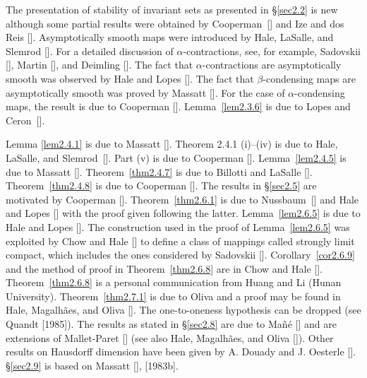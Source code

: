 \documentclass{surv-l}
\theoremstyle{plain}
\theoremstyle{definition}
\numberwithin{equation}{section}
\numberwithin{figure}{chapter}
\begin{document}
The presentation of stability of invariant sets as presented in \S \ref{sec2.2} is new although some partial results were obtained by Cooperman~[\citeyear{1978c}] and Ize and dos Reis [\citeyear{1978id}]. Asymptotically smooth maps were introduced by Hale, LaSalle, and Slemrod [\citeyear{1972hls}]. For a detailed discussion of $\alpha$-contractions, see, for example, Sadovskii [\citeyear{1972s}], Martin [\citeyear{1976martin}], and Deimling [\citeyear{1985d}]. The fact that $\alpha$-contractions are asymptotically smooth was observed by Hale and Lopes [\citeyear{1973hl}]. The fact that $\beta$-condensing maps are asymptotically smooth was proved by Massatt [\citeyear{1980massatt}]. For the case of $\alpha$-condensing maps, the result is due to Cooperman [\citeyear{1978c}]. Lemma~\ref{lem2.3.6} is due to Lopes and Ceron~[\citeyear{1984lc}].

Lemma \ref{lem2.4.1} is due to Massatt [\citeyear{1983ma}]. Theorem 2.4.1 (i)--(iv) is due to Hale, LaSalle, and Slemrod~[\citeyear{1972hls}]. Part (v) is due to Cooperman [\citeyear{1978c}]. Lemma~\ref{lem2.4.5} is due to Massatt [\citeyear{1983ma}]. Theorem~\ref{thm2.4.7} is due to Billotti and LaSalle [\citeyear{1971bl}]. Theorem~\ref{thm2.4.8} is due to Cooperman [\citeyear{1978c}]. The results in \S \ref{sec2.5} are motivated by Cooperman [\citeyear{1978c}]. Theorem~\ref{thm2.6.1} is due to Nussbaum~[\citeyear{1972n}] and Hale and Lopes [\citeyear{1973hl}] with the proof given following the latter. Lemma~\ref{lem2.6.5} is due to Hale and Lopes [\citeyear{1973hl}]. The construction used in the proof of Lemma~\ref{lem2.6.5} was exploited by Chow and Hale [\citeyear{1974ch}] to define a class of mappings called strongly limit compact, which includes the ones considered by Sadovskii [\citeyear{1972s}]. Corollary~\ref{cor2.6.9} and the method of proof in Theorem~\ref{thm2.6.8} are in Chow and Hale [\citeyear{1974h}]. Theorem~\ref{thm2.6.8} is a personal communication from Huang and Li (Hunan University). Theorem~\ref{thm2.7.1} is due to Oliva and a proof may be found in Hale, Magalh\~{a}es, and Oliva [\citeyear{1984hmo}]. The one-to-oneness hypothesis can be dropped (see Quandt [1985]). The results as stated in \S \ref{sec2.8} are due to Ma\~{n}\'{e} [\citeyear{1981m}] and are extensions of Mallet-Paret [\citeyear{1976mp}] (see also Hale, Magalh\~{a}es, and Oliva [\citeyear{1984hmo}]). Other results on Hausdorff dimension have been given by A. Douady and J. Oesterle [\citeyear{1980do}]. \S \ref{sec2.9} is based on Massatt [\citeyear{1983ma}], [1983b].
\end{document}
